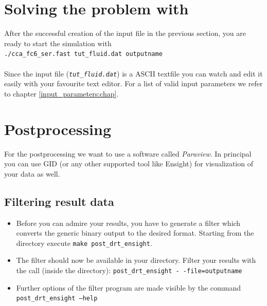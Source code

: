 \section{Solving the problem with \baci{}}

After the successful creation of the input file in the previous section,
you are ready to start the simulation with \\
\texttt{./cca\_fc6\_ser.fast tut\_fluid.dat outputname} 
\\
\\
Since the input file (\texttt{\emph{tut\_fluid.dat}}) is a ASCII textfile you can
watch and edit it easily with your favourite text editor. For a list of valid input parameters
we refer to chapter \ref{input_parameters:chap}.
\section{Postprocessing}

For the postprocessing we want to use a software called \emph{Paraview}. 
In principal you can use GID (or any other supported tool like Ensight) for visualization 
of your data as well.

\subsection{Filtering result data}
\begin{itemize}
\item Before you can admire your results, you have to generate a filter 
which converts the generic binary \baci{} output to the desired format.
Starting from the \baci{} directory execute \texttt{make post\_drt\_ensight}.
\item The filter should now be available in your \baci{} directory. Filter your results with
the call (inside the \baci{} directory): \texttt{post\_drt\_ensight -\,-file=outputname} 
\item Further options of the filter program are made visible by the command \texttt{post\_drt\_ensight --help}
\end{itemize}


